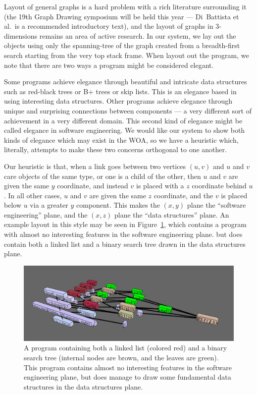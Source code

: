 \documentclass[11pt]{article}
\begin{document}
Layout of general graphs is a hard problem with a rich literature surrounding
it (the 19th Graph Drawing symposium will be held this year --- Di~Battista et
al.\cite{gd}\ is a recommended introductory text), and the layout of graphs in
3-dimensions remains an area of active research.  In our system, we lay out the
objects using only the spanning-tree of the graph created from a breadth-first
search starting from the very top stack frame.  When layout out the program, we
note that there are two ways a program might be considered elegant. 

Some programs achieve elegance through beautiful and intricate data structures
such as red-black trees or B+ trees or skip lists.  This is an elegance based
in using interesting data structures.  Other programs achieve elegance through
unique and surprising connections between components --- a very different sort
of achievement in a very different domain.  This second kind of elegance might
be called elegance in software engineering.  We would like our system to show
both kinds of elegance which may exist in the WOA, so we have a heuristic
which, literally, attempts to make these two concerns orthogonal to one
another.

Our heuristic is that, when a link goes between two vertices $(u,v)$ and $u$
and $v$ care objects of the same type, or one is a child of the other, then $u$
and $v$ are given the same $y$ coordinate, and instead $v$ is placed with a $z$
coordinate behind $u$.  In all other cases, $u$ and $v$ are given the same $z$
coordinate, and the $v$ is placed below $u$ via a greater $y$ component.  This
makes the $(x,y)$ plane the ``software engineering'' plane, and the $(x,z)$
plane the ``data structures'' plane.  An example layout in this style may be
seen in Figure~\ref{fig:basic}, which contains a program with almost no
interesting features in the software engineering plane. but does contain both a
linked list and a binary search tree drawn in the data structures plane.  

\begin{figure}
\begin{center}
\includegraphics[width=5in]{figures/basic.png}
\end{center}
\caption{A program containing both a linked list (colored red) and a binary
search tree (internal nodes are brown, and the leaves are green).  This program
contains almost no interesting features in the software engineering plane, but
does manage to draw some fundamental data structures in the data structures
plane.}
\label{fig:basic}
\end{figure}
\end{document}
